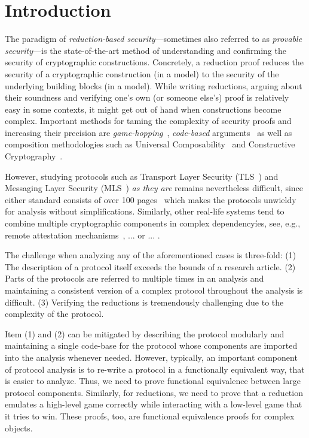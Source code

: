\section{Introduction}
The paradigm of \emph{reduction-based security}---sometimes also referred to as \emph{provable security}---is the state-of-the-art method of understanding and confirming the security of cryptographic constructions. Concretely, a reduction proof reduces the security of a cryptographic construction (in a model) to the security of the underlying building blocks (in a model). While writing reductions, arguing about their soundness and verifying one's own (or someone else's) proof is relatively easy in some contexts, it might get out of hand when constructions become complex. Important methods for taming the complexity of security proofs and increasing their precision are \emph{game-hopping}~\cite{EPRINT:Shoup04}, \emph{code-based} arguments~\cite{EC:BelRog06} as well as composition methodologies such as Universal Composability~\cite{FOCS:Canetti01} and Constructive Cryptography~\cite{FC:Maurer10}.

However, studying protocols such as Transport Layer Security (TLS~\cite{TLS13})
and Messaging Layer Security (MLS~\cite{MLS}) \emph{as they are} 
remains nevertheless difficult, since either
standard consists of over 100 pages~\cite{X} which makes the protocols unwieldy for analysis without simplifications. Similarly, other real-life systems
tend to combine multiple cryptographic components in complex dependencyíes,
see, e.g., remote attestation mechanisms~\cite{https://arxiv.org/pdf/2102.08804.pdf,https://en.wikipedia.org/wiki/Trusted_Computing}, ... or ... .

The challenge when analyzing any of the aforementioned cases is three-fold:
(1) The description of a protocol itself exceeds the bounds of a research
article.
(2) Parts of the protocols are referred to multiple times in an analysis
and maintaining a consistent version of a complex protocol throughout the 
analysis is difficult.
(3) Verifying the reductions is tremendously challenging due to the complexity
of the protocol.

Item (1) and (2) can be mitigated by describing the protocol
modularly and maintaining a single code-base for the protocol
whose components are imported into the analysis whenever needed.
However, typically, an important component of protocol analysis is to
re-write a protocol in a functionally equivalent way, that is easier
to analyze. Thus, we need to prove functional equivalence between 
large protocol components. Similarly, for reductions, we need to
prove that a reduction emulates a high-level game correctly while
interacting with a low-level game that it tries to win. These proofs, too,
are functional equivalence proofs for complex objects.


